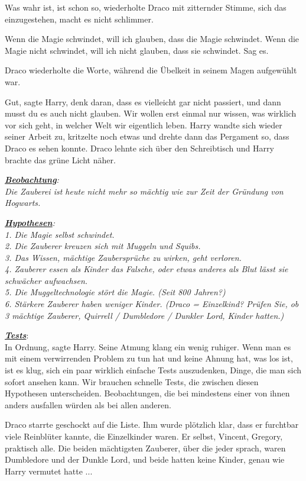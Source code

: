 \glqq{}Was wahr ist, ist schon so\grqq{}, wiederholte Draco mit zitternder
Stimme, \glqq{}sich das einzugestehen, macht es nicht schlimmer.\grqq{}

\glqq{}Wenn die Magie schwindet, will ich glauben, dass die Magie schwindet.
Wenn die Magie nicht schwindet, will ich nicht glauben, dass sie schwindet. Sag
es.\grqq{}

Draco wiederholte die Worte, während die Übelkeit in seinem Magen aufgewühlt
war.

\glqq{}Gut\grqq{}, sagte Harry, \glqq{}denk daran, dass es vielleicht gar nicht
passiert, und dann musst du es auch nicht glauben. Wir wollen erst einmal nur
wissen, was wirklich vor sich geht, in welcher Welt wir eigentlich leben.\grqq{}
Harry wandte sich wieder seiner Arbeit zu, kritzelte noch etwas und drehte dann
das Pergament so, dass Draco es sehen konnte. Draco lehnte sich über den
Schreibtisch und Harry brachte das grüne Licht näher.

\emph{\textbf{\underline{Beobachtung}}:\\
Die Zauberei ist heute nicht mehr so mächtig wie zur Zeit der Gründung von
Hogwarts.}

\emph{\textbf{\underline{Hypothesen}}:}\\
\emph{1. Die Magie selbst schwindet.\\
2. Die Zauberer kreuzen sich mit Muggeln und Squibs.\\
3. Das Wissen, mächtige Zaubersprüche zu wirken, geht verloren.\\
4. Zauberer essen als Kinder das Falsche, oder etwas anderes als Blut lässt sie
schwächer aufwachsen.\\
5. Die Muggeltechnologie stört die Magie. (Seit 800 Jahren?)\\
6. Stärkere Zauberer haben weniger Kinder. (Draco = Einzelkind? Prüfen Sie, ob 3
mächtige Zauberer, Quirrell / Dumbledore / Dunkler Lord, Kinder hatten.)}

\textbf{\emph{\underline{Tests}}}:\\
\glqq{}In Ordnung\grqq{}, sagte Harry. Seine Atmung klang ein wenig ruhiger.
\glqq{}Wenn man es mit einem verwirrenden Problem zu tun hat und keine Ahnung
hat, was los ist, ist es klug, sich ein paar wirklich einfache Tests
auszudenken, Dinge, die man sich sofort ansehen kann. Wir brauchen schnelle
Tests, die zwischen diesen Hypothesen unterscheiden. Beobachtungen, die bei
mindestens einer von ihnen anders ausfallen würden als bei allen anderen.\grqq{}

Draco starrte geschockt auf die Liste. Ihm wurde plötzlich klar, dass er
furchtbar viele Reinblüter kannte, die Einzelkinder waren. Er selbst, Vincent,
Gregory, praktisch alle. Die beiden mächtigsten Zauberer, über die jeder sprach,
waren Dumbledore und der Dunkle Lord, und beide hatten keine Kinder, genau wie
Harry vermutet hatte ...

